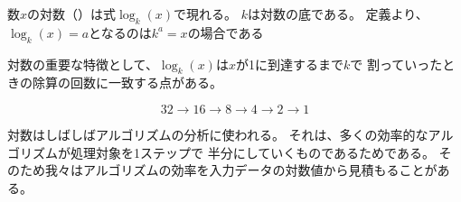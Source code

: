 
\begin{comment}
The \key{logarithm} of a number $x$
is denoted $\log_k(x)$, where $k$ is the base
of the logarithm.
According to the definition,
$\log_k(x)=a$ exactly when $k^a=x$.

A useful property of logarithms is
that $\log_k(x)$ equals the number of times
we have to divide $x$ by $k$ before we reach 
the number 1.
For example, $\log_2(32)=5$
because 5 divisions by 2 are needed:
\end{comment}

数$x$の対数（）は式$\log_k(x)$で現れる。
$k$は対数の底である。
定義より、$\log_k(x)=a$となるのは$k^a=x$の場合である

対数の重要な特徴として、$\log_k(x)$は$x$が1に到達するまで$k$で
割っていったときの除算の回数に一致する点がある。

\[32 \rightarrow 16 \rightarrow 8 \rightarrow 4 \rightarrow 2 \rightarrow 1 \]

\begin{comment}
Logarithms are often used in the analysis of
algorithms, because many efficient algorithms
halve something at each step.
Hence, we can estimate the efficiency of such algorithms
using logarithms.

The logarithm of a product is
\[\log_k(ab) = \log_k(a)+\log_k(b),\]
and consequently,
\[\log_k(x^n) = n \cdot \log_k(x).\]
In addition, the logarithm of a quotient is
\[\log_k\Big(\frac{a}{b}\Big) = \log_k(a)-\log_k(b).\]
Another useful formula is
\[\log_u(x) = \frac{\log_k(x)}{\log_k(u)},\]
and using this, it is possible to calculate
logarithms to any base if there is a way to
calculate logarithms to some fixed base.
\end{comment}

対数はしばしばアルゴリズムの分析に使われる。
それは、多くの効率的なアルゴリズムが処理対象を1ステップで
半分にしていくものであるためである。
そのため我々はアルゴリズムの効率を入力データの対数値から見積もることがある。


\begin{comment}
The \key{natural logarithm} $\ln(x)$ of a number $x$
is a logarithm whose base is $e \approx 2.71828$.
Another property of logarithms is that
the number of digits of an integer $x$ in base $b$ is
$\lfloor \log_b(x)+1 \rfloor$.
For example, the representation of
$123$ in base $2$ is 1111011 and
$\lfloor \log_2(123)+1 \rfloor = 7$.
\end{comment}

